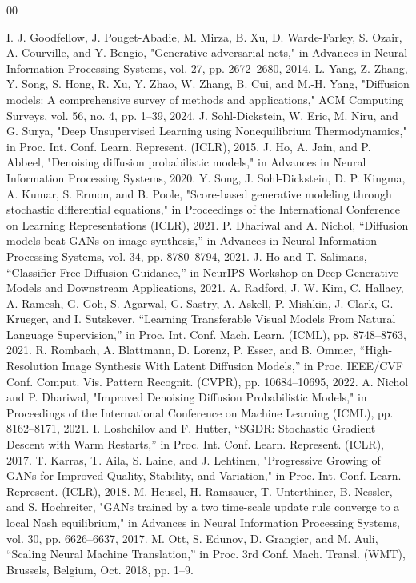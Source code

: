 \documentclass[conference]{IEEEtran}
\begin{document}
\begin{thebibliography}{00}

 I. J. Goodfellow, J. Pouget-Abadie, M. Mirza, B. Xu, D. Warde-Farley, S. Ozair, A. Courville, and Y. Bengio, "Generative adversarial nets," in Advances in Neural Information Processing Systems, vol. 27, pp. 2672–2680, 2014.
 L. Yang, Z. Zhang, Y. Song, S. Hong, R. Xu, Y. Zhao, W. Zhang, B. Cui, and M.-H. Yang, "Diffusion models: A comprehensive survey of methods and applications," ACM Computing Surveys, vol. 56, no. 4, pp. 1–39, 2024.
 J. Sohl-Dickstein, W. Eric, M. Niru, and G. Surya, "Deep Unsupervised Learning using Nonequilibrium Thermodynamics," in Proc. Int. Conf. Learn. Represent. (ICLR), 2015.
 J. Ho, A. Jain, and P. Abbeel, "Denoising diffusion probabilistic models," in Advances in Neural Information Processing Systems, 2020.
 Y. Song, J. Sohl-Dickstein, D. P. Kingma, A. Kumar, S. Ermon, and B. Poole, "Score-based generative modeling through stochastic differential equations," in Proceedings of the International Conference on Learning Representations (ICLR), 2021.
 P. Dhariwal and A. Nichol, ``Diffusion models beat GANs on image synthesis,'' in Advances in Neural Information Processing Systems, vol. 34, pp. 8780–8794, 2021.
 J. Ho and T. Salimans, ``Classifier-Free Diffusion Guidance,'' in NeurIPS Workshop on Deep Generative Models and Downstream Applications, 2021.
 A. Radford, J. W. Kim, C. Hallacy, A. Ramesh, G. Goh, S. Agarwal, G. Sastry, A. Askell, P. Mishkin, J. Clark, G. Krueger, and I. Sutskever, ``Learning Transferable Visual Models From Natural Language Supervision,'' in Proc. Int. Conf. Mach. Learn. (ICML), pp. 8748--8763, 2021.
 R. Rombach, A. Blattmann, D. Lorenz, P. Esser, and B. Ommer, ``High-Resolution Image Synthesis With Latent Diffusion Models,'' in Proc. IEEE/CVF Conf. Comput. Vis. Pattern Recognit. (CVPR), pp. 10684--10695, 2022.
 A. Nichol and P. Dhariwal, "Improved Denoising Diffusion Probabilistic Models," in Proceedings of the International Conference on Machine Learning (ICML), pp. 8162–8171, 2021.
 I. Loshchilov and F. Hutter, ``SGDR: Stochastic Gradient Descent with Warm Restarts,'' in Proc. Int. Conf. Learn. Represent. (ICLR), 2017.
 T. Karras, T. Aila, S. Laine, and J. Lehtinen, "Progressive Growing of GANs for Improved Quality, Stability, and Variation," in Proc. Int. Conf. Learn. Represent. (ICLR), 2018.
 M. Heusel, H. Ramsauer, T. Unterthiner, B. Nessler, and S. Hochreiter, "GANs trained by a two time-scale update rule converge to a local Nash equilibrium," in Advances in Neural Information Processing Systems, vol. 30, pp. 6626–6637, 2017.
 M. Ott, S. Edunov, D. Grangier, and M. Auli, ``Scaling Neural Machine Translation,'' in Proc. 3rd Conf. Mach. Transl. (WMT), Brussels, Belgium, Oct. 2018, pp. 1--9.

\end{thebibliography}
\vspace{12pt}
\end{document}
